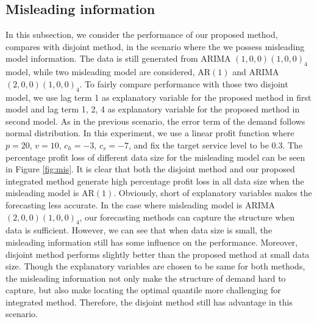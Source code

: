 \documentclass{article}
\begin{document}
\subsection{Misleading information}
In this subsection, we consider the performance of our proposed method, compares with disjoint method, in the scenario where the we possess misleading model information. The data is still generated from ARIMA $(1,0,0)(1,0,0)_4$ model, while two misleading model are considered, AR$(1)$ and ARIMA $(2,0,0)(1,0,0)_4$. To fairly compare performance with those two disjoint model, we use lag term 1 as explanatory variable for the proposed method in first model and lag term 1, 2, 4 as explanatory variable for the proposed method in second model. As in the previous scenario, the error term of the demand follows normal distribution. In this experiment, we use a linear profit function where $p=20$, $v=10$, $c_h=-3$, $c_s=-7$, and fix the target service level to be 0.3. The percentage profit loss of different data size for the misleading model can be seen in Figure \ref{fig:mis}. It is clear that both the disjoint method and our proposed integrated method generate high percentage profit loss in all data size when the misleading model is AR$(1)$. Obviously, short of explanatory variables makes the forecasting less accurate. In the case where misleading model is ARIMA $(2,0,0)(1,0,0)_4$, our forecasting methods can capture the structure when data is sufficient. However, we can see that when data size is small, the misleading information still has some influence on the performance. Moreover, disjoint method performs slightly better than the proposed method at small data size. Though the explanatory variables are chosen to be same for both methods, the misleading information not only make the structure of demand hard to capture, but also make locating the optimal quantile more challenging for integrated method. Therefore, the disjoint method still has advantage in this scenario.
\end{document}
